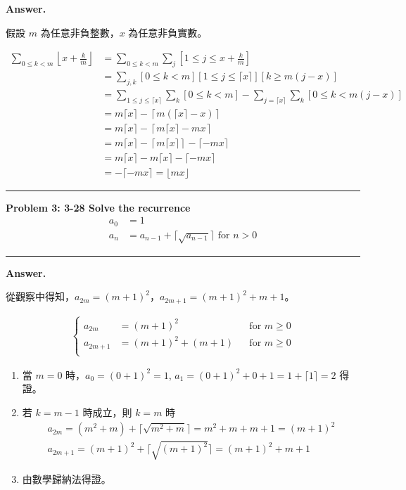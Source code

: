 \documentclass[11pt]{article}
\newcommand\question[2]{\vspace{.25in}\hrule\textbf{#1: #2}\vspace{.5em}\hrule\vspace{.10in}}
\renewcommand\part[1]{\vspace{.10in}\textbf{#1}}
\begin{document}
\part{Answer.}

假設 $m$ 為任意非負整數，$x$ 為任意非負實數。

\begin{align*}
\sum_{0 \le k < m} \left \lfloor x + \frac{k}{m} \right \rfloor
	&= \sum_{0 \le k < m} \sum_j [1 \le j \le x + \frac{k}{m}] \\
	&= \sum_{j,k} [0 \le k < m] [1 \le j \le \lceil x \rceil] [k \ge m(j-x)] \\
	&= \sum_{1 \le j \le \lceil x \rceil} \sum_k [0 \le k < m] 
		- \sum_{j=\lceil x \rceil} \sum_k [0 \le k < m(j-x)] \\
	&= m \lceil x \rceil - \left \lceil m(\lceil x \rceil - x) \right \rceil \\
	&= m \lceil x \rceil - \left \lceil m \lceil x \rceil - mx \right \rceil \\
	&= m \lceil x \rceil - \left \lceil m \lceil x \rceil \right \rceil
			- \lceil - mx \rceil \\
	&= m \lceil x \rceil - m \lceil x \rceil - \lceil - mx \rceil \\
	&= - \lceil - mx \rceil = \lfloor mx \rfloor
\end{align*}

\question{Problem 3}{3-28 Solve the recurrence
\begin{align*}a_0 &= 1 \\ a_n &= a_{n-1} + \lceil \sqrt{a_{n-1}} \rceil \text{ for } n > 0\end{align*}
}

\part{Answer.}

從觀察中得知，$a_{2m} = (m+1)^2$，$a_{2m+1} = (m+1)^2 + m + 1$。

\begin{align*}
\left\{\begin{matrix}
a_{2m} &= (m+1)^2 && \text{for } m \ge 0\\
a_{2m+1} &= (m+1)^2 + (m+1) && \text{for } m \ge 0 \\
\end{matrix}\right.
\end{align*}

\begin{enumerate}
	\item 
		當 $m = 0$ 時，$a_0 = (0+1)^2 = 1$, $a_1 = (0+1)^2 + 0 + 1 = 1 + \lceil 1 \rceil = 2$ 得證。
	\item 若 $k = m-1$ 時成立，則 $k = m$ 時
		\begin{align*}
			a_{2m} = (m^2 + m) + \lceil \sqrt{m^2 + m} \rceil = m^2 + m + m +1 = (m+1)^2\\
			a_{2m+1} = (m+1)^2 + \lceil \sqrt{(m+1)^2} \rceil = (m+1)^2 + m + 1
		\end{align*}
	\item 由數學歸納法得證。
\end{enumerate}
\end{document}
